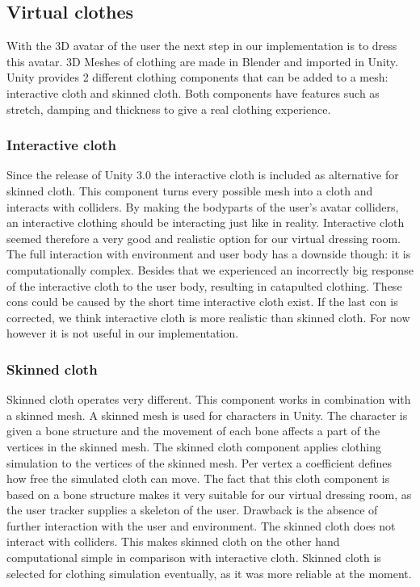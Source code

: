 \documentclass[a4paper]{article}
\begin{document}
\subsection{Virtual clothes}
\label{sec:virtual_clothes}
With the 3D avatar of the user the next step in our implementation is to dress this avatar. 3D Meshes of clothing are made in Blender and imported in Unity. Unity provides 2 different clothing components that can be added to a mesh: interactive cloth and skinned cloth. Both components have features such as stretch, damping and thickness to give a real clothing experience.

\subsubsection{Interactive cloth}
\label{sec:interactive_cloth}	
Since the release of Unity 3.0 the interactive cloth is included as alternative for skinned cloth. This component turns every possible mesh into a cloth and interacts with colliders. By making the bodyparts of the user's avatar colliders, an interactive clothing should be interacting just like in reality. Interactive cloth seemed therefore a very good and realistic option for our virtual dressing room. The full interaction with environment and user body has a downside though: it is computationally complex. Besides that we experienced an incorrectly big response of the interactive cloth to the user body, resulting in catapulted clothing. These cons could be caused by the short time interactive cloth exist. If the last con is corrected, we think interactive cloth is more realistic than skinned cloth. For now however it is not useful in our implementation.
	 	
\subsubsection{Skinned cloth}
\label{sec:skinned_cloth}	 	
Skinned cloth operates very different. This component works in combination with a skinned mesh. A skinned mesh is used for characters in Unity. The character is given a bone structure and the movement of each bone affects a part of the vertices in the skinned mesh. The skinned cloth component applies clothing simulation to the vertices of the skinned mesh. Per vertex a coefficient defines how free the simulated cloth can move. The fact that this cloth component is based on a bone structure makes it very suitable for our virtual dressing room, as the user tracker supplies a skeleton of the user. Drawback is the absence of further interaction with the user and environment. The skinned cloth does not interact with colliders. This makes skinned cloth on the other hand computational simple in comparison with interactive cloth. Skinned cloth is selected for clothing simulation eventually, as it was more reliable at the moment.
\end{document}
